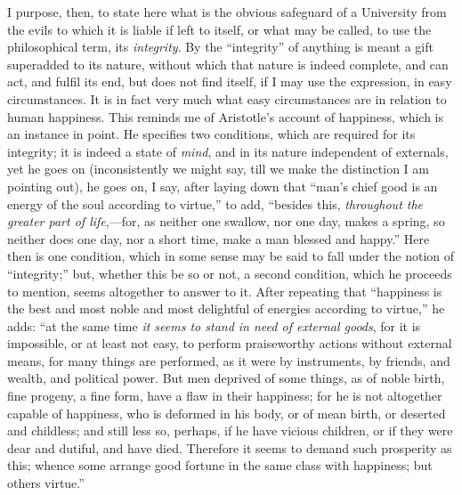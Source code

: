 I purpose, then, to state here
what is the obvious safeguard of a University from the evils to which
it is liable if left to itself, or what may be called, to use the
philosophical term, its \emph{integrity}. By the ``integrity'' of
anything is meant a gift superadded to its nature, without which that
nature is indeed complete, and can act, and fulfil its end, but does
not find itself, if I may use the expression, in easy circumstances.
It is in fact very much what easy circumstances are in relation to
human happiness. This reminds me of Aristotle's account of happiness,
which is an instance in point. He specifies two conditions, which are
required for its integrity; it is indeed a state of \emph{mind}, and
in its nature independent of externals, yet he goes on (inconsistently
we might say, till we make the distinction I am pointing out), he goes
on, I say, after laying down that ``man's chief good is an energy of
the soul according to virtue,'' to add, ``besides this, \emph{throughout
the greater part of life},—for, as neither one swallow, nor one
day, makes a spring, so neither does one day, nor a short time,
make a man blessed and happy.'' Here then is one condition, which in
some sense may be said to fall under the notion of ``integrity;''
but, whether this be so or not, a second condition, which he proceeds
to mention, seems altogether to answer to it. After repeating that ``happiness is the best and most noble and most delightful of
energies according to virtue,'' he adds: ``at the same time \emph{it
seems to stand in need of external goods}, for it is impossible, or
at least not easy, to perform praiseworthy actions without external
means, for many things are performed, as it were by instruments, by
friends, and wealth, and political power. But men deprived of some
things, as of noble birth, fine progeny, a fine form, have a flaw in
their happiness; for he is not altogether capable of happiness, who is
deformed in his body, or of mean birth, or deserted and childless; and
still less so, perhaps, if he have vicious children, or if they were
dear and dutiful, and have died. Therefore it seems to demand such
prosperity as this; whence some arrange good fortune in the same class
with happiness; but others virtue.''

